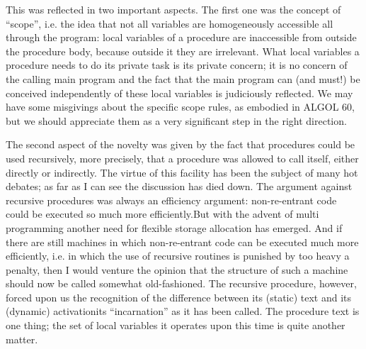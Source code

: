 \documentclass[twoside,11pt]{book}
\begin{document}
This was reflected in two important aspects. The first one was the concept of ``scope'', i.e. the idea that not all variables are homogeneously accessible all through the program: local variables of a procedure are inaccessible from  outside the procedure body, because outside it they are irrelevant. What local variables a procedure needs to do its private task is its private concern; it is no concern of the calling main program and the fact that the main program can (and must!) be conceived independently of these local variables is judiciously reflected. We may have some misgivings about the specific scope rules, as embodied in ALGOL 60, but we should appreciate them as a very significant step in the right direction.

The second aspect of the novelty was given by the fact that procedures could be used recursively, more precisely, that a procedure was allowed to call itself, either directly or indirectly. The virtue of this facility has been the subject of many hot debates; as far as I can see the discussion has died down. The argument against recursive procedures was always an efficiency argument: non-re-entrant code could be executed so much more efficiently.But with the advent of multi programming another need for flexible storage allocation has emerged. And if there are still machines in which non-re-entrant code can be executed much more efficiently, i.e. in which the use of recursive routines is punished by too heavy a penalty, then I would venture the opinion that the structure of such a machine should now be called somewhat old-fashioned. The recursive procedure, however, forced upon us the recognition of the difference between its (static) text and its (dynamic) activation\textemdash{}its ``incarnation'' as it has been called. The procedure text is one thing; the set of local variables it operates upon this time is quite another matter.
\end{document}
